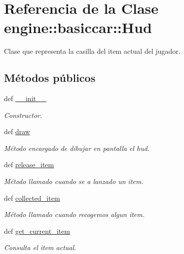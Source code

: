 \hypertarget{classengine_1_1basiccar_1_1Hud}{
\section{\-Referencia de la \-Clase engine\-:\-:basiccar\-:\-:\-Hud}
\label{classengine_1_1basiccar_1_1Hud}
}


\-Clase que representa la casilla del item actual del jugador.  


\subsection*{\-Métodos públicos}
\begin{DoxyCompactItemize}
\item 
def \hyperlink{classengine_1_1basiccar_1_1Hud_a8289a5ea135548ab6745b5f02119c617}{\-\_\-\-\_\-init\-\_\-\-\_\-}
\begin{DoxyCompactList}\small\item\em \-Constructor. \end{DoxyCompactList}\item 
def \hyperlink{classengine_1_1basiccar_1_1Hud_aafb58e5f375f2678f889977bdb8693f0}{draw}
\begin{DoxyCompactList}\small\item\em \-Método encargado de dibujar en pantalla el hud. \end{DoxyCompactList}\item 
\hypertarget{classengine_1_1basiccar_1_1Hud_aad36307699b8f8b93b48690a4a5a8fcf}{
def \hyperlink{classengine_1_1basiccar_1_1Hud_aad36307699b8f8b93b48690a4a5a8fcf}{release\-\_\-item}}
\label{classengine_1_1basiccar_1_1Hud_aad36307699b8f8b93b48690a4a5a8fcf}

\begin{DoxyCompactList}\small\item\em \-Método llamado cuando se a lanzado un item. \end{DoxyCompactList}\item 
\hypertarget{classengine_1_1basiccar_1_1Hud_a6980febfa825967584a89fd27c718879}{
def \hyperlink{classengine_1_1basiccar_1_1Hud_a6980febfa825967584a89fd27c718879}{collected\-\_\-item}}
\label{classengine_1_1basiccar_1_1Hud_a6980febfa825967584a89fd27c718879}

\begin{DoxyCompactList}\small\item\em \-Método llamado cuando recogemos algun item. \end{DoxyCompactList}\item 
def \hyperlink{classengine_1_1basiccar_1_1Hud_ac0e4e2a5a485bb0d28e5b386ecef4bfc}{get\-\_\-current\-\_\-item}
\begin{DoxyCompactList}\small\item\em \-Consulta el item actual. \end{DoxyCompactList}\end{DoxyCompactItemize}
